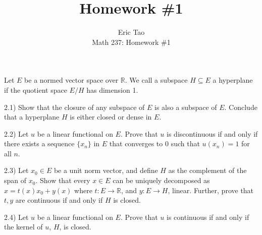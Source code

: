 \documentclass[10pt]{article}
\newenvironment{problem}[2][]{\begin{trivlist}
\item[\hskip \labelsep {\bfseries #1}\hskip \labelsep {\bfseries #2.}]}{\end{trivlist}}
\begin{document}
 
\title{Homework \#1}
\author{Eric Tao\\
Math 237: Homework \#1}
\maketitle

\begin{problem}{Question 2}

Let $E$ be a normed vector space over $\mathbb{R}$. We call a subspace $H \subseteq E$ a hyperplane if the quotient space $E/H$ has dimension 1.

2.1) Show that the closure of any subspace of $E$ is also a subspace of $E$. Conclude that a hyperplane $H$ is either closed or dense in $E$.

2.2) Let $u$ be a linear functional on $E$. Prove that $u$ is discontinuous if and only if there exists a sequence $\{ x_n  \}$ in $E$ that converges to 0 such that $u(x_n) = 1$ for all $n$.

2.3) Let $x_0 \in E$ be a unit norm vector, and define $H$ as the complement of the span of $x_0$. Show that every $x \in E$ can be uniquely decomposed as $x = t(x)x_0 + y(x)$ where $t: E \to \mathbb{R}$, and $y: E \to H$, linear. Further, prove that $t, y$ are continuous if and only if $H$ is closed.

2.4) Let $u$ be a linear functional on $E$. Prove that $u$ is continuous if and only if the kernel of $u$, $H$, is closed.

\end{problem}
\end{document}
